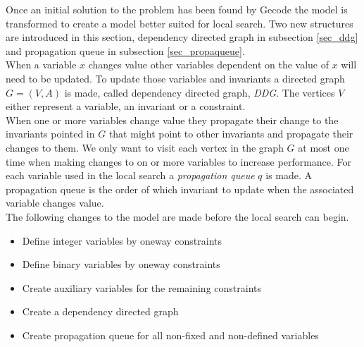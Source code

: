 Once an initial solution to the problem has been found by Gecode the model is transformed to create a model better 
suited for local search. Two new structures  are introduced in 
this section, dependency directed graph  in subsection \ref{sec_ddg} and propagation 
queue in subsection \ref{sec_propaqueue}.  \\ 
When a variable $x$ changes value other variables dependent on the value of $x$ will need to be updated. To 
update those variables and invariants a directed graph $G=(V,A)$ is made, called dependency directed graph, \emph{DDG}. 
The vertices $V$ either represent a variable, an invariant or a constraint. \\  
When one or more variables change value they propagate their change to the invariants pointed in $G$ that might point 
to other invariants and propagate their changes to them. We only want to visit each vertex in the graph $G$ at most one 
time when making changes to on or more variables to increase performance. For each variable used in 
the local search a \emph{propagation queue} $q$ is made. A propagation queue is the order of which invariant to update 
when the associated variable changes value.  \medskip \\
The following changes to the model are made before the local search can begin. 
\begin{itemize}
 \item Define integer variables by oneway constraints
 \item Define binary variables by oneway constraints 
 \item Create auxiliary variables for the remaining constraints
 \item Create a dependency directed graph
 \item Create propagation queue for all non-fixed and non-defined variables
\end{itemize}

